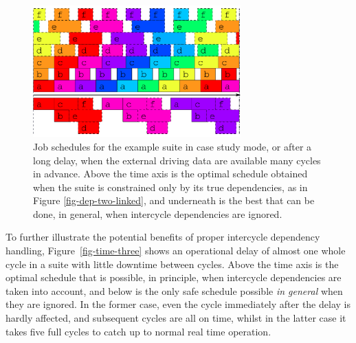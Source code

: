 \documentclass[11pt,a4paper]{article}
\begin{document}
\begin{figure}
    \begin{center} 
        \includegraphics[width=8cm]{inkscape-svg/timeline-two}
    \end{center} 
    \caption[Optimal job schedule when all external data is
    available]{\small Job schedules for the example suite in case study
    mode, or after a long delay, when the external driving data are
    available many cycles in advance. Above the time axis is the optimal
    schedule obtained when the suite is constrained only by its true
    dependencies, as in Figure \ref{fig-dep-two-linked}, and underneath
    is the best that can be done, in general, when intercycle
    dependencies are ignored.} 
    \label{fig-time-two}
\end{figure} 

To further illustrate the potential benefits of proper intercycle
dependency handling, Figure~\ref{fig-time-three} shows an operational
delay of almost one whole cycle in a suite with little downtime between
cycles. Above the time axis is the optimal schedule that is possible, in
principle, when intercycle dependencies are taken into account, and
below is the only safe schedule possible {\em in general} when they are
ignored.  In the former case, even the cycle immediately after the delay
is hardly affected, and subsequent cycles are all on time, whilst in the
latter case it takes five full cycles to catch up to normal real time
operation.
\end{document}
